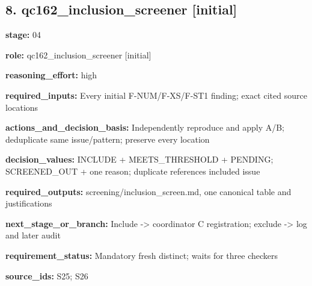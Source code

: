 \documentclass[10pt,a4paper]{article}
\begin{document}
\subsection*{8.\allowbreak{} qc162\_\allowbreak{}inclusion\_\allowbreak{}screener [initial]}
\textbf{stage:} 04\par
\textbf{role:} qc162\_\allowbreak{}inclusion\_\allowbreak{}screener [initial]\par
\textbf{reasoning\_\allowbreak{}effort:} high\par
\textbf{required\_\allowbreak{}inputs:} Every initial F-\allowbreak{}NUM/\allowbreak{}F-\allowbreak{}XS/\allowbreak{}F-\allowbreak{}ST1 finding; exact cited source locations\par
\textbf{actions\_\allowbreak{}and\_\allowbreak{}decision\_\allowbreak{}basis:} Independently reproduce and apply A/\allowbreak{}B; deduplicate same issue/\allowbreak{}pattern; preserve every location\par
\textbf{decision\_\allowbreak{}values:} INCLUDE + MEETS\_\allowbreak{}THRESHOLD + PENDING; SCREENED\_\allowbreak{}OUT + one reason; duplicate references included issue\par
\textbf{required\_\allowbreak{}outputs:} screening/\allowbreak{}inclusion\_\allowbreak{}screen.\allowbreak{}md, one canonical table and justifications\par
\textbf{next\_\allowbreak{}stage\_\allowbreak{}or\_\allowbreak{}branch:} Include -\allowbreak{}> coordinator C registration; exclude -\allowbreak{}> log and later audit\par
\textbf{requirement\_\allowbreak{}status:} Mandatory fresh distinct; waits for three checkers\par
\textbf{source\_\allowbreak{}ids:} S25; S26\par
\end{document}
